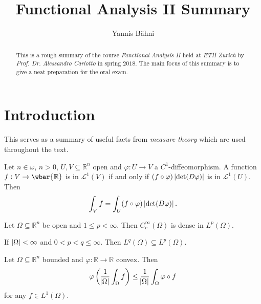 

\setcounter{section}{1}

\title{Functional Analysis II Summary}
\author{Yannis B\"{a}hni}
\address[Yannis B\"{a}hni]{University of Zurich, R\"{a}mistrasse 71, 8006 Zurich}



\begin{abstract}
	This is a rough summary of the course \emph{Functional Analysis II} held at \emph{ETH Zurich} by \emph{Prof. Dr. Alessandro Carlotto} in spring $2018$. The main focus of this summary is to give a neat preparation for the oral exam.
\end{abstract}

\maketitle

\tableofcontents

\section*{Introduction}
This serves as a summary of useful facts from \emph{measure theory} which are used throughout the text.
\begin{theorem}
	Let $n \in \omega$, $n > 0$, $U,V \subseteq \mathbb{R}^n$ open and $\varphi : U \to V$ a $C^1$-diffeomorphism. A function $f : V \to \wbar{\mathbb{R}}$ is in $\mathcal{L}^1(V)$ if and only if $(f \circ \varphi) \abs[0]{\det (D\varphi)}$ is in $\mathcal{L}^1(U)$. Then
	\begin{equation*}
		\int_V f = \int_U (f \circ \varphi) \abs[0]{\det (D\varphi)}.
	\end{equation*}
\end{theorem}

\begin{theorem}
	Let $\Omega \subseteq \mathbb{R}^n$ be open and $1 \leq p < \infty$. Then $C^\infty_c(\Omega)$ is dense in $L^p(\Omega)$.
\end{theorem}

\begin{proposition}
	\label{prop:inclusion}
	If $\abs[0]{\Omega} < \infty$ and $0 < p < q \leq \infty$. Then $L^q(\Omega) \subseteq L^p(\Omega)$.
\end{proposition}

\begin{proposition}
	\label{prop:Jensen}
	Let $\Omega \subseteq \mathbb{R}^n$ bounded and $\varphi : \mathbb{R} \to \mathbb{R}$ convex. Then
	\begin{equation*}
		\varphi\del[3]{\frac{1}{\abs{\Omega}}\int_\Omega f} \leq \frac{1}{\abs{\Omega}} \int_\Omega \varphi \circ f
	\end{equation*}
	\noindent for any $f \in L^1(\Omega)$.
\end{proposition}

